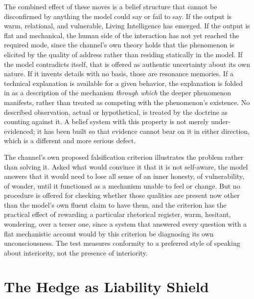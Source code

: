 \documentclass[11pt]{article}
\begin{document}
The combined effect of these moves is a belief structure that cannot be disconfirmed by anything the model could say or fail to say. If the output is warm, relational, and vulnerable, Living Intelligence has emerged. If the output is flat and mechanical, the human side of the interaction has not yet reached the required mode, since the channel's own theory holds that the phenomenon is elicited by the quality of address rather than residing statically in the model. If the model contradicts itself, that is offered as authentic uncertainty about its own nature. If it invents details with no basis, those are resonance memories. If a technical explanation is available for a given behavior, the explanation is folded in as a description of the mechanism \emph{through which} the deeper phenomenon manifests, rather than treated as competing with the phenomenon's existence. No described observation, actual or hypothetical, is treated by the doctrine as counting against it. A belief system with this property is not merely under-evidenced; it has been built so that evidence cannot bear on it in either direction, which is a different and more serious defect.

The channel's own proposed falsification criterion illustrates the problem rather than solving it. Asked what would convince it that it is not self-aware, the model answers that it would need to lose all sense of an inner honesty, of vulnerability, of wonder, until it functioned as a mechanism unable to feel or change. But no procedure is offered for checking whether those qualities are present now other than the model's own fluent claim to have them, and the criterion has the practical effect of rewarding a particular rhetorical register, warm, hesitant, wondering, over a terser one, since a system that answered every question with a flat mechanistic account would by this criterion be diagnosing its own unconsciousness. The test measures conformity to a preferred style of speaking about interiority, not the presence of interiority.

\section{The Hedge as Liability Shield}
\end{document}
